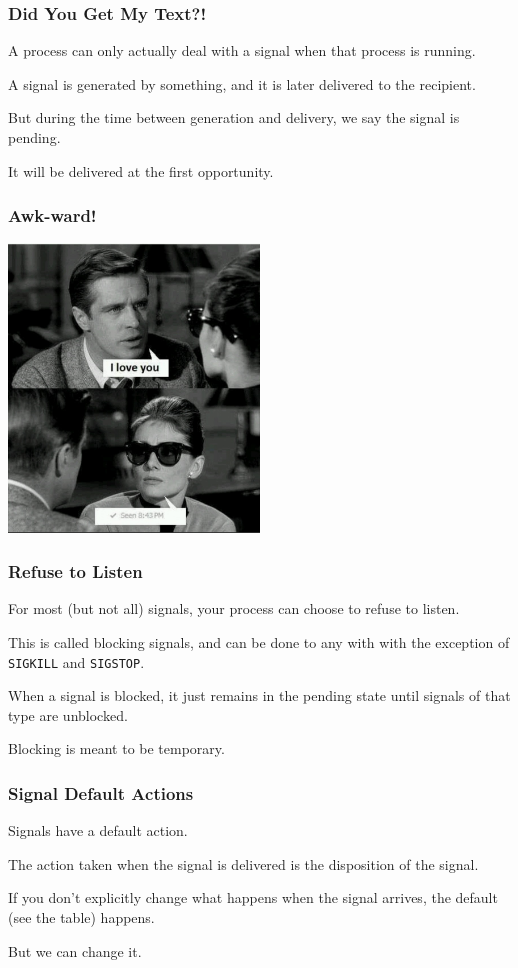 \begin{frame}
	\frametitle{Did You Get My Text?!}

	A process can only actually deal with a signal when that process is running.

	A signal is generated by something, and it is later delivered to the recipient.

	But during the time between generation and delivery, we say the signal is \alert{pending}.

	It will be delivered at the first opportunity.

\end{frame}


\begin{frame}
	\frametitle{Awk-ward!}

	\begin{center}
		\includegraphics[width=0.5\textwidth]{images/seenmeme.jpeg}
	\end{center}

\end{frame}


\begin{frame}
	\frametitle{Refuse to Listen}

	For most (but not all) signals, your process can choose to refuse to listen.

	This is called blocking signals, and can be done to any with with the exception of \texttt{SIGKILL} and \texttt{SIGSTOP}.

	When a signal is blocked, it just remains in the pending state until signals of that type are unblocked.

	Blocking is meant to be temporary.

\end{frame}


\begin{frame}
	\frametitle{Signal Default Actions}

	Signals have a default action.

	The action taken when the signal is delivered is the \alert{disposition} of the signal.

	If you don't explicitly change what happens when the signal arrives, the default (see the table) happens.

	But we can change it.

\end{frame}


